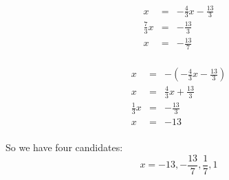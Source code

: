 \documentclass[letterpaper,12pt,fleqn]{article}
\begin{document}
\begin{enumerate}
  \begin{minipage}[t]{2.5in}
    \begin{eqnarray*}
      x &=& -\frac{4}{3}x-\frac{13}{3} \\
      \frac{7}{3}x &=& -\frac{13}{3} \\
      x &=& -\frac{13}{7} \\
    \end{eqnarray*}
  \end{minipage}
  \begin{minipage}[t]{2.5in}
    \begin{eqnarray*}
      x &=& -\left(-\frac{4}{3}x-\frac{13}{3}\right) \\
      x &=& \frac{4}{3}x+\frac{13}{3} \\
      \frac{1}{3}x &=& -\frac{13}{3} \\
      x &=& -13 \\
    \end{eqnarray*}
  \end{minipage}

  So we have four candidates:
  \[x=-13,-\frac{13}{7},\frac{1}{7},1\]


\end{enumerate}
\end{document}
